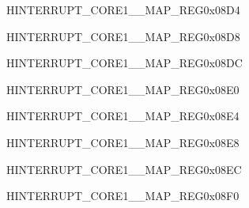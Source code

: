 \begin{register}{H}{INTERRUPT\_CORE1\_\_MAP\_REG}{0x08D4}\label{regdesc:INTERRUPTCORE1TG1T0INTMAPREG}
\end{register}
\vspace{-3em}

\begin{register}{H}{INTERRUPT\_CORE1\_\_MAP\_REG}{0x08D8}\label{regdesc:INTERRUPTCORE1TG1T1INTMAPREG}
\end{register}
\vspace{-3em}

\begin{register}{H}{INTERRUPT\_CORE1\_\_MAP\_REG}{0x08DC}\label{regdesc:INTERRUPTCORE1TG1WDTINTMAPREG}
\end{register}
\vspace{-3em}

\begin{register}{H}{INTERRUPT\_CORE1\_\_MAP\_REG}{0x08E0}\label{regdesc:INTERRUPTCORE1CACHEIAINTMAPREG}
\end{register}
\vspace{-3em}

\begin{register}{H}{INTERRUPT\_CORE1\_\_MAP\_REG}{0x08E4}\label{regdesc:INTERRUPTCORE1SYSTIMERTARGET0INTMAPREG}
\end{register}
\vspace{-3em}

\begin{register}{H}{INTERRUPT\_CORE1\_\_MAP\_REG}{0x08E8}\label{regdesc:INTERRUPTCORE1SYSTIMERTARGET1INTMAPREG}
\end{register}
\vspace{-3em}

\begin{register}{H}{INTERRUPT\_CORE1\_\_MAP\_REG}{0x08EC}\label{regdesc:INTERRUPTCORE1SYSTIMERTARGET2INTMAPREG}
\end{register}
\vspace{-3em}

\begin{register}{H}{INTERRUPT\_CORE1\_\_MAP\_REG}{0x08F0}\label{regdesc:INTERRUPTCORE1SPIMEMREJECTINTRMAPREG}
\end{register}
\vspace{-3em}

